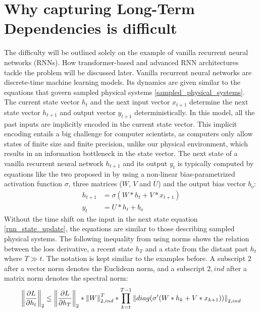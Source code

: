 \documentclass[draft,final]{vutinfth} %
\begin{document}
    \section{Why capturing Long-Term Dependencies is difficult} \label{long_term_difficult}
    The difficulty will be outlined solely on the example of vanilla recurrent neural networks (RNNs).
    How transformer-based and advanced RNN architectures tackle the problem will be discussed later.
    Vanilla recurrent neural networks are discrete-time machine learning models. 
    Its dynamics are given similar to the equations that govern sampled physical systems \ref{sampled_physical_systems}.
    The current state vector $h_{t}$ and the next input vector $x_{t+1}$ determine the next state vector $h_{t+1}$ and output vector $y_{t+1}$ deterministically.
    In this model, all the past inputs are implicitly encoded in the current state vector.
    This implicit encoding entails a big challenge for computer scientists, as computers only allow states of finite size and finite precision, unlike our physical environment, which results in an information bottleneck in the state vector.
    The next state of a vanilla recurrent neural network $h_{t+1}$ and its output $y_{t}$ is typically computed by equations like the two proposed in \cite[p. 2]{UnitaryRNNs} by using a non-linear bias-parametrized activation function $\sigma$, three matrices ($W$, $V$ and $U$) and the output bias vector $b_o$:
    \begin{align}
        \label{rnn_state_update}
        h_{t+1} &= \sigma(W*h_t + V*x_{t+1}) \\
        \label{rnn_output}
        y_{t} &= U*h_{t} + b_o
    \end{align}
    Without the time shift on the input in the next state equation \ref{rnn_state_update}, the equations are similar to those describing sampled physical systems.
    The following inequality from \cite[p. 2]{UnitaryRNNs} using norms shows the relation between the loss derivative, a recent state $h_T$ and a state from the distant past $h_t$ where $T \gg t$.
    The notation is kept similar to the examples before. A subscript $2$ after a vector norm denotes the Euclidean norm, and a subscript $2,ind$ after a matrix norm denotes the spectral norm:
    \begin{align}
        \label{gradient_formula}
        \left\Vert \pdv{L}{h_t} \right\Vert_2 \leq \left\Vert \pdv{L}{h_T} \right\Vert_2 * \left\Vert W \right\Vert_{2,ind}^T * \prod^{T-1}_{k=t} \left\Vert diag(\sigma'(W*h_k + V*x_{k+1})) \right\Vert_{2,ind}
    \end{align}
\end{document}

